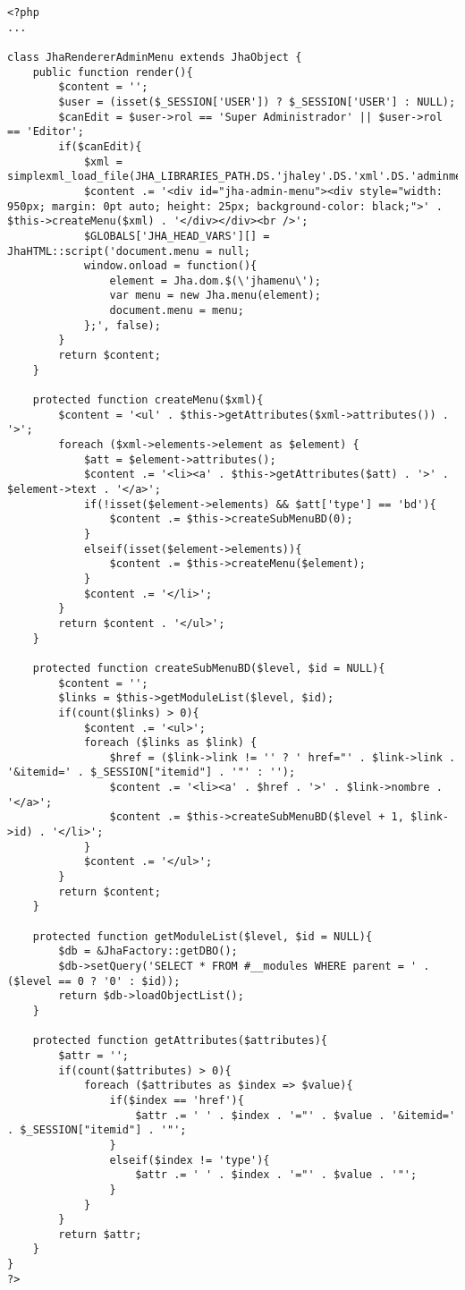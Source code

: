 \begin{lstlisting}[label=jha_renderer_head,caption=Renderizador para el tag HTML `head'.]
<?php
...

class JhaRendererAdminMenu extends JhaObject {
    public function render(){
    	$content = '';
        $user = (isset($_SESSION['USER']) ? $_SESSION['USER'] : NULL);
        $canEdit = $user->rol == 'Super Administrador' || $user->rol == 'Editor';
        if($canEdit){
        	$xml = simplexml_load_file(JHA_LIBRARIES_PATH.DS.'jhaley'.DS.'xml'.DS.'adminmenu.xml');
        	$content .= '<div id="jha-admin-menu"><div style="width: 950px; margin: 0pt auto; height: 25px; background-color: black;">' . $this->createMenu($xml) . '</div></div><br />';
        	$GLOBALS['JHA_HEAD_VARS'][] = JhaHTML::script('document.menu = null;
        	window.onload = function(){
        	    element = Jha.dom.$(\'jhamenu\');
        	    var menu = new Jha.menu(element);
        	    document.menu = menu;
   	        };', false);
        }
        return $content;
    }
    
    protected function createMenu($xml){
    	$content = '<ul' . $this->getAttributes($xml->attributes()) . '>';
   		foreach ($xml->elements->element as $element) {
   			$att = $element->attributes();
   			$content .= '<li><a' . $this->getAttributes($att) . '>' . $element->text . '</a>';
   			if(!isset($element->elements) && $att['type'] == 'bd'){
			    $content .= $this->createSubMenuBD(0);
   			}
   			elseif(isset($element->elements)){
   				$content .= $this->createMenu($element);
   			}
   			$content .= '</li>';
   		}
    	return $content . '</ul>';
    }
    
    protected function createSubMenuBD($level, $id = NULL){
    	$content = '';
    	$links = $this->getModuleList($level, $id);
    	if(count($links) > 0){
    		$content .= '<ul>';
	    	foreach ($links as $link) {
	    		$href = ($link->link != '' ? ' href="' . $link->link . '&itemid=' . $_SESSION["itemid"] . '"' : '');
	    		$content .= '<li><a' . $href . '>' . $link->nombre . '</a>';
	    		$content .= $this->createSubMenuBD($level + 1, $link->id) . '</li>';
	    	}
	    	$content .= '</ul>';
    	}
    	return $content;
    }
    
    protected function getModuleList($level, $id = NULL){
    	$db = &JhaFactory::getDBO();
    	$db->setQuery('SELECT * FROM #__modules WHERE parent = ' . ($level == 0 ? '0' : $id));
        return $db->loadObjectList();
    }
    
    protected function getAttributes($attributes){
    	$attr = '';
    	if(count($attributes) > 0){
    		foreach ($attributes as $index => $value){
    			if($index == 'href'){
    				$attr .= ' ' . $index . '="' . $value . '&itemid=' . $_SESSION["itemid"] . '"';
    			}
    			elseif($index != 'type'){
    			    $attr .= ' ' . $index . '="' . $value . '"';
    			}
    		}
    	}
    	return $attr;
    }
}
?>
\end{lstlisting}
